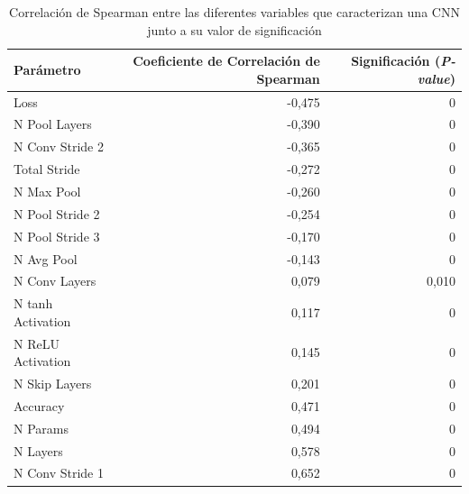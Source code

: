 \begin{itemize}
    \begin{table}[h]
    \caption{Correlación de Spearman entre las diferentes variables que caracterizan una CNN junto a su valor de significación}
    \label{tab:correlacion}
    \centering
    \begin{tabular}{l|r|r}
    \toprule
    \textbf{Parámetro} & \textbf{Coeficiente de Correlación de Spearman} & \textbf{Significación (\textit{P-value})} \\ \hline
    Loss               & -0,475                                         & 0                                \\
    N Pool Layers      & -0,390                                         & 0                                \\
    N Conv Stride 2    & -0,365                                         & 0                                \\
    Total Stride       & -0,272                                         & 0                                \\
    N Max Pool         & -0,260                                         & 0                                \\
    N Pool Stride 2    & -0,254                                         & 0                                \\
    N Pool Stride 3    & -0,170                                         & 0                                \\
    N Avg Pool         & -0,143                                         & 0                                \\
    N Conv Layers      & 0,079                                          & 0,010                            \\
    N tanh Activation  & 0,117                                          & 0                                \\
    N ReLU Activation  & 0,145                                          & 0                                \\
    N Skip Layers      & 0,201                                          & 0                                \\
    Accuracy           & 0,471                                          & 0                                \\
    N Params           & 0,494                                          & 0                                \\
    N Layers           & 0,578                                          & 0                                \\
    N Conv Stride 1    & 0,652                                          & 0    \\
    \bottomrule
    \end{tabular}
    \end{table}
    

\end{itemize}
